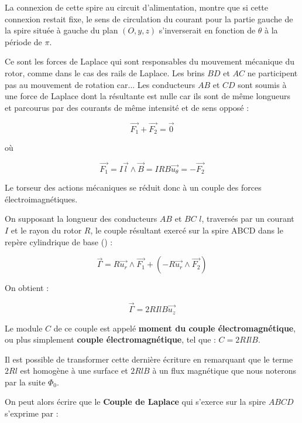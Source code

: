 \documentclass{article}
\begin{document}
La connexion de cette spire au circuit d'alimentation, montre que si cette connexion restait fixe, le sens de circulation du courant pour la partie gauche de la spire située à gauche du plan $(O,y,z)$ s'inverserait en fonction de $\theta$ à la période de $\pi$. \medskip

Ce sont les forces de Laplace qui sont responsables du mouvement mécanique du rotor, comme dans le cas des rails de Laplace. Les brins $BD$ et $AC$ ne participent pas au mouvement de rotation car... Les conducteurs $AB$ et $CD$ sont soumis à une force de Laplace dont la résultante est nulle car ils sont de même longueurs et parcourus par des courants de même intensité et de sens opposé :

\begin{equation}
    \Vec{F_1} + \Vec{F_2} = \Vec{0}
\end{equation}

où

\begin{equation}
    \Vec{F_1} = I\Vec{l} \land \vec{B} = IRB \vec{u_\theta} = -\vec{F_2}
\end{equation}

Le torseur des actions mécaniques se réduit donc à un couple des forces électroimagnétiques.\medskip

On supposant la longueur des conducteurs $AB$ et $BC$ $l$, traversés par un courant $I$ et le rayon du rotor $R$, le couple résultant exercé sur la spire ABCD dans le repère cylindrique de base () :

\begin{equation}
    \Vec{\Gamma} = R\Vec{u_r} \land \Vec{F_1} + (-R\Vec{u_r} \land \Vec{F_2})
\end{equation}

On obtient :

\begin{equation}
    \vec{\Gamma} = 2RIlB \vec{u_z}
\end{equation}

Le module $C$ de ce couple est appelé \textbf{moment du couple électromagnétique}, ou plus simplement \textbf{couple électromagnétique}, tel que : $C = 2RIlB$. \medskip


Il est possible de transformer cette dernière écriture en remarquant que le terme $2Rl$ est homogène à une surface et $2RlB$ à un flux magnétique que nous noterons par la suite $\Phi_0$.

On peut alors écrire que le \textbf{Couple de Laplace} qui s'exerce sur la spire $ABCD$ s'exprime par :
\end{document}
